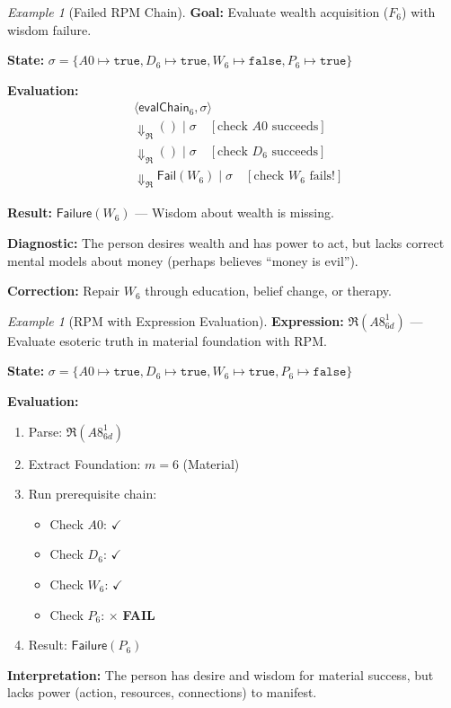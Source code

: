 \documentclass[11pt,twoside,openright]{book}
\theoremstyle{definition}
\theoremstyle{plain}
\theoremstyle{remark}
\newtheorem{example}[definition]{Example}
\newcommand{\RPM}{\mathfrak{R}}
\newcommand{\bigstep}{\Downarrow}
\newcommand{\Failed}{\mathsf{Fail}}
\begin{document}
\begin{example}[Failed RPM Chain]
\label{ex:rpm-failure}
\textbf{Goal:} Evaluate wealth acquisition ($F_6$) with wisdom failure.

\textbf{State:} $\sigma = \{A0 \mapsto \mathtt{true}, D_6 \mapsto \mathtt{true}, W_6 \mapsto \mathtt{false}, P_6 \mapsto \mathtt{true}\}$

\textbf{Evaluation:}
\begin{align}
&\langle \mathsf{evalChain}_6, \sigma \rangle \\
&\bigstep_\RPM () \mid \sigma \quad [\text{check } A0 \text{ succeeds}] \\
&\bigstep_\RPM () \mid \sigma \quad [\text{check } D_6 \text{ succeeds}] \\
&\bigstep_\RPM \Failed(W_6) \mid \sigma \quad [\text{check } W_6 \text{ fails!}]
\end{align}

\textbf{Result:} $\mathsf{Failure}(W_6)$ --- Wisdom about wealth is missing.

\textbf{Diagnostic:} The person desires wealth and has power to act, but lacks correct mental models about money (perhaps believes ``money is evil'').

\textbf{Correction:} Repair $W_6$ through education, belief change, or therapy.
\end{example}

\begin{example}[RPM with Expression Evaluation]
\label{ex:rpm-expr}
\textbf{Expression:} $\RPM(A8^1_{6d})$ --- Evaluate esoteric truth in material foundation with RPM.

\textbf{State:} $\sigma = \{A0 \mapsto \mathtt{true}, D_6 \mapsto \mathtt{true}, W_6 \mapsto \mathtt{true}, P_6 \mapsto \mathtt{false}\}$

\textbf{Evaluation:}
\begin{enumerate}
\item Parse: $\RPM(A8^1_{6d})$
\item Extract Foundation: $m = 6$ (Material)
\item Run prerequisite chain:
   \begin{itemize}
   \item Check $A0$: $\checkmark$
   \item Check $D_6$: $\checkmark$
   \item Check $W_6$: $\checkmark$
   \item Check $P_6$: $\times$ \textbf{FAIL}
   \end{itemize}
\item Result: $\mathsf{Failure}(P_6)$
\end{enumerate}

\textbf{Interpretation:} The person has desire and wisdom for material success, but lacks power (action, resources, connections) to manifest.
\end{example}
\end{document}
